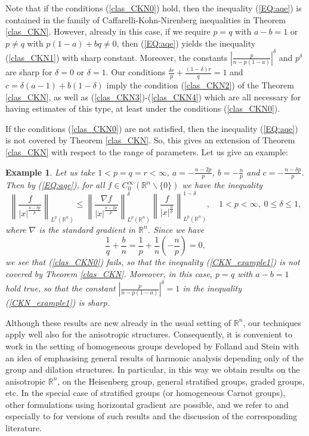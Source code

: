 \documentclass[a4paper,12pt,reqno]{amsart}
\renewcommand\eqref[1]{(\ref{#1})} %
\numberwithin{equation}{section}
\theoremstyle{plain}
\newtheorem{exa}[thm]{Example}
\theoremstyle{definition}
\newcommand{\Rn}{\mathbb R^{n}}
\begin{document}
Note that if the conditions \eqref{clas_CKN0}
hold, then the inequality \eqref{EQ:aqe} is contained in the family of Caffarelli-Kohn-Nirenberg inequalities in Theorem \ref{clas_CKN}.
However, already in this case, if we require $p=q$ with $a-b=1$ or $p\neq q$ with $p(1-a)+bq\neq0$, then \eqref{EQ:aqe} yields the inequality \eqref{clas_CKN1} with sharp constant. Moreover, the constants $\left|\frac{p}{n-p(1-a)}\right|^{\delta}$ and $p^{\delta}$ are sharp for $\delta=0$ or $\delta=1$. Our conditions $\frac{\delta r}{p}+\frac{(1-\delta)r}{q}=1$ and $c=\delta(a-1)+b(1-\delta)$ imply the condition \eqref{clas_CKN2} of the Theorem \ref{clas_CKN}, as well as \eqref{clas_CKN3}-\eqref{clas_CKN4} which are all necessary for having estimates of this type, at least under the conditions \eqref{clas_CKN0}.

If the conditions \eqref{clas_CKN0} are not satisfied, then the inequality \eqref{EQ:aqe} is not covered by Theorem \ref{clas_CKN}. So, this gives an extension of Theorem \ref{clas_CKN} with respect to the range of parameters. Let us give an example:

\begin{exa}\label{CKN_example} Let us take $1<p=q=r<\infty$, $a=-\frac{n-2p}{p}$, $b=-\frac{n}{p}$ and $c=-\frac{n-\delta p}{p}$.
Then by \eqref{EQ:aqe}, for all $f\in C_{0}^{\infty}(\mathbb{R}^{n}\backslash\{0\})$ we have  the inequality
\begin{equation}\label{CKN_example1}
\left\|\frac{f}{|x|^{\frac{n-\delta p}{p}}}\right\|_{L^{p}(\Rn)}\leq
\left\|\frac{\nabla f}{|x|^{\frac{n-2p}{p}}}\right\|^{\delta}_{L^{p}(\Rn)}
\left\|\frac{f}{|x|^{\frac{n}{p}}}\right\|^{1-\delta}_{L^{p}(\Rn)}, \quad 1<p<\infty, \;0\leq\delta\leq1,
\end{equation}
where $\nabla$ is the standard gradient in $\Rn$. Since we have
$$\frac{1}{q}+\frac{b}{n}=\frac{1}{p}+\frac{1}{n}\left(-\frac{n}{p}\right)=0,$$
we see that \eqref{clas_CKN0} fails, so that the inequality \eqref{CKN_example1} is not covered by Theorem \ref{clas_CKN}. Moreover, in this case, $p=q$ with $a-b=1$ hold true, so that the constant $\left|\frac{p}{n-p(1-a)}\right|^{\delta}=1$ in the inequality \eqref{CKN_example1} is sharp.
\end{exa}

Although these results are new already in the usual setting of $\Rn$, our techniques apply well also for the anisotropic structures. Consequently, it is convenient  to work in the setting of homogeneous groups developed by Folland and Stein \cite{FS-Hardy} with an idea of  emphasising general results of harmonic analysis depending only of the group and dilation structures.
In particular, in this way we obtain results on the anisotropic $\Rn$, on the Heisenberg group, general stratified groups, graded groups, etc. In the special case of stratified groups (or homogeneous Carnot groups), other formulations using horizontal gradient are possible, and we refer to \cite{Ruzhansky-Suragan:Layers} and especially to \cite{Ruzhansky-Suragan:JDE} for versions of such results and the discussion of the corresponding literature.
\end{document}
